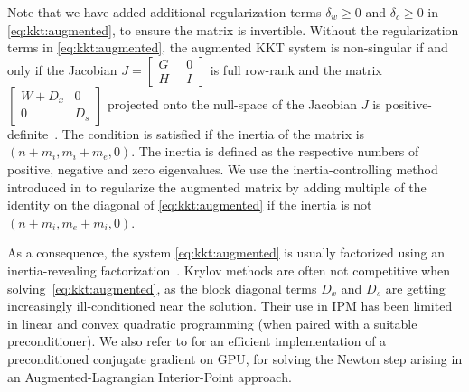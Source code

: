 Note that we have added additional regularization terms $\delta_w \geq 0 $
and $\delta_c \geq 0$ in \eqref{eq:kkt:augmented}, to ensure the
matrix is invertible.
Without the regularization terms in \eqref{eq:kkt:augmented}, the augmented KKT system is non-singular
if and only if the Jacobian $J = \begin{bmatrix} G \; &\; 0 \\ H \;&\; I \end{bmatrix}$
is full row-rank and the matrix $\begin{bmatrix} W + D_x & 0 \\ 0 & D_s \end{bmatrix}$
projected onto the null-space of the Jacobian $J$ is positive-definite~\cite{benzi2005numerical}.
The condition is satisfied if the inertia of the matrix is $(n + m_i, m_i + m_e, 0)$.
The inertia is defined as the respective numbers of positive, negative and zero eigenvalues.
We use the inertia-controlling method introduced in \cite{wachter2006implementation}
to regularize the augmented matrix by adding multiple of the identity
on the diagonal of \eqref{eq:kkt:augmented} if the inertia is not $(n+m_i, m_e+m_i, 0)$.

As a consequence, the system \eqref{eq:kkt:augmented} is usually factorized using
an inertia-revealing \lblt factorization~\cite{duff1983multifrontal}.
Krylov methods are often not competitive when solving~\eqref{eq:kkt:augmented},
as the block diagonal terms $D_x$ and $D_s$ are getting increasingly
ill-conditioned near the solution. Their use in IPM has been limited in
linear and convex quadratic programming \cite{gondzio-2012} (when paired
with a suitable preconditioner). We also refer to \cite{cao-seth-laird-2016}
for an efficient implementation of a preconditioned conjugate gradient
on GPU, for solving the Newton step arising in an Augmented-Lagrangian Interior-Point
approach.

